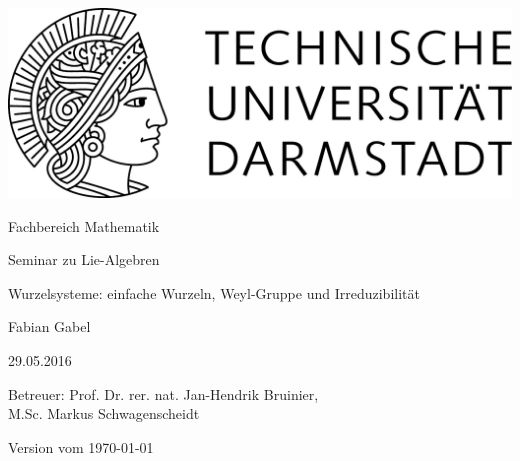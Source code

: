 \begin{titlepage}
  \begin{center}
    \vspace{1cm}
    \includegraphics[width=0.5\linewidth]{TU_Darmstadt_Logo.pdf}
    \vspace{12pt}
    
    \large{Fachbereich Mathematik}
    \vspace{2cm}
    
    \large{Seminar zu Lie-Algebren}
    \vspace{2cm}

    \huge{Wurzelsysteme: einfache Wurzeln, Weyl-Gruppe und Irreduzibilität}
    
    \vspace*{2cm}    
    
		\large
    Fabian Gabel
    \vspace*{.5cm}

    29.05.2016 \\
    \vspace*{1cm}

    Betreuer: Prof. Dr. rer. nat. Jan-Hendrik Bruinier,  \\
    \hspace{0.6cm}M.Sc. Markus Schwagenscheidt

    \vspace*{.5cm}

    \tiny{Version vom \today}
  \end{center}
\end{titlepage}
\vspace*{\fill}
